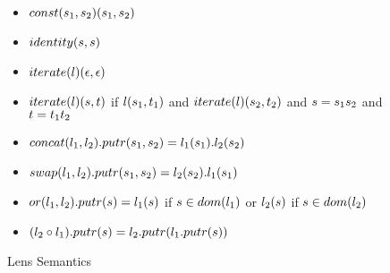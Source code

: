 \begin{figure}[b]
\centering
\begin{itemize}
\item $const(s_1,s_2)(s_1,s_2)$
\item $identity(s,s)$
\item $iterate(l)(\epsilon,\epsilon)$
\item $iterate(l)(s,t)$ if $l(s_1,t_1)$ and $iterate(l)(s_2,t_2)$ and $s=s_1s_2$ and $t=t_1t_2$
\item $concat(l_1,l_2).putr(s_1,s_2) = l_1(s_1).l_2(s_2)$
\item $swap(l_1,l_2).putr(s_1,s_2) = l_2(s_2).l_1(s_1)$
\item $or(l_1,l_2).putr(s) = l_1(s)$ if $s \in dom(l_1)$ or $l_2(s)$ if $s \in dom(l_2)$
\item $(l_2 \circ l_1).putr(s) = l_2.putr(l_1.putr(s))$
\end{itemize}
\caption{Lens Semantics}
\label{fig:lens-semantics}
\end{figure}

